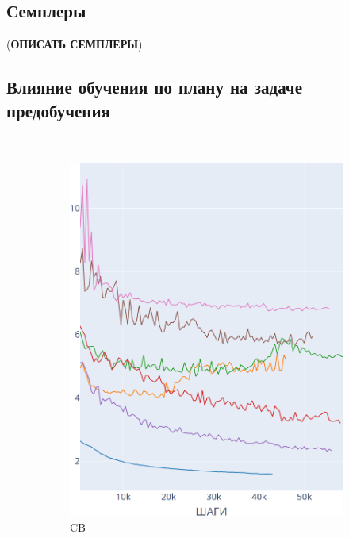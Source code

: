 \documentclass{spbau-diploma}
\begin{document}
\subsection{Семплеры}
({\bf ОПИСАТЬ СЕМПЛЕРЫ})
\pagebreak
\subsection{Влияние обучения по плану на задаче предобучения}
\ 

\begin{figure}[h]
	\centering
	\begin{subfigure}{.3\textwidth}
		\centering
		\includegraphics[scale=0.2]{BooksCorpus_CB}
		\caption{CB}
		\label{fig:BooksCorpus_graphs_CB}
	\end{subfigure}
	\begin{subfigure}{.3\textwidth}
		\centering

\end{subfigure}
\end{figure}
\end{document}
